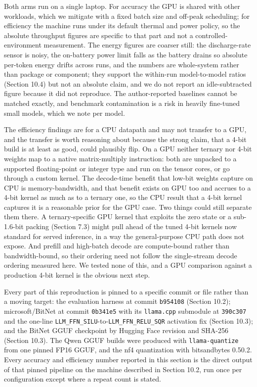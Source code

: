 \documentclass[11pt]{article}
\begin{document}
Both arms run on a single laptop. For accuracy the GPU is shared with other workloads,
which we mitigate with a fixed batch size and off-peak scheduling; for efficiency the
machine runs under its default thermal and power policy, so the absolute throughput
figures are specific to that part and not a controlled-environment measurement. The
energy figures are coarser still: the discharge-rate sensor is noisy, the on-battery
power limit falls as the battery drains so absolute per-token energy drifts across runs,
and the numbers are whole-system rather than package or component; they support the
within-run model-to-model ratios (Section 10.4) but not an absolute claim, and we do not
report an idle-subtracted figure because it did not reproduce. The author-reported baselines cannot be matched exactly, and benchmark
contamination is a risk in heavily fine-tuned small models, which we note per model.

The efficiency findings are for a CPU datapath and may not transfer to a GPU, and the
transfer is worth reasoning about because the strong claim, that a 4-bit build is at
least as good, could plausibly flip. On a GPU neither ternary nor 4-bit weights map to a
native matrix-multiply instruction: both are unpacked to a supported floating-point or
integer type and run on the tensor cores, or go through a custom kernel. The decode-time
benefit that low-bit weights capture on CPU is memory-bandwidth, and that benefit exists
on GPU too and accrues to a 4-bit kernel as much as to a ternary one, so the CPU result
that a 4-bit kernel captures it is a reasonable prior for the GPU case. Two things could
still separate them there. A ternary-specific GPU kernel that exploits the zero state or
a sub-1.6-bit packing (Section 7.3) might pull ahead of the tuned 4-bit kernels now
standard for served inference, in a way the general-purpose CPU path does not expose.
And prefill and high-batch decode are compute-bound rather than bandwidth-bound, so their
ordering need not follow the single-stream decode ordering measured here. We tested none
of this, and a GPU comparison against a production 4-bit kernel is the obvious next step.

Every part of this reproduction is pinned to a specific commit or file rather than a
moving target: the evaluation harness at commit \texttt{b954108} (Section 10.2); microsoft/BitNet
at commit \texttt{0b341e5} with its \texttt{llama.cpp} submodule at \texttt{390c307} and the one-line
\texttt{LLM\_FFN\_SILU}-to-\texttt{LLM\_FFN\_RELU\_SQR} activation fix (Section 10.3); and the BitNet GGUF
checkpoint by Hugging Face revision and SHA-256 (Section 10.3). The Qwen GGUF builds were
produced with \texttt{llama-quantize} from one pinned FP16 GGUF, and the nf4 quantization with
bitsandbytes 0.50.2. Every accuracy and efficiency number reported in this section is the
direct output of that pinned pipeline on the machine described in Section 10.2, run once
per configuration except where a repeat count is stated.
\end{document}
